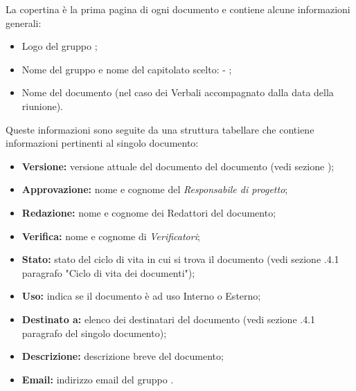         La copertina è la prima pagina di ogni documento e contiene alcune informazioni generali:
        \begin{itemize}
          \item Logo del gruppo \Gruppo{};
          \item Nome del gruppo e nome del capitolato scelto: \Gruppo{} - \NomeProgetto{};
          \item Nome del documento (nel caso dei Verbali accompagnato dalla data della riunione).
        \end{itemize}
        Queste informazioni sono seguite da una struttura tabellare che contiene informazioni pertinenti al singolo documento:
        \begin{itemize}
          \item \textbf{Versione:} versione attuale del documento del documento (vedi sezione );%
          \item \textbf{Approvazione:} nome e cognome del \textit{Responsabile di progetto};
          \item \textbf{Redazione:} nome e cognome dei Redattori del documento;
          \item \textbf{Verifica:} nome e cognome di \textit{Verificatori};
          \item \textbf{Stato:} stato del ciclo di vita in cui si trova il documento (vedi sezione .4.1 paragrafo "Ciclo di vita dei documenti");
          \item \textbf{Uso:} indica se il documento è ad uso Interno o Esterno;
          \item \textbf{Destinato a:} elenco dei destinatari del documento (vedi sezione .4.1 paragrafo del singolo documento);
          \item \textbf{Descrizione:} descrizione breve del documento;
          \item \textbf{Email:} indirizzo email del gruppo \Gruppo{}.
        \end{itemize}

